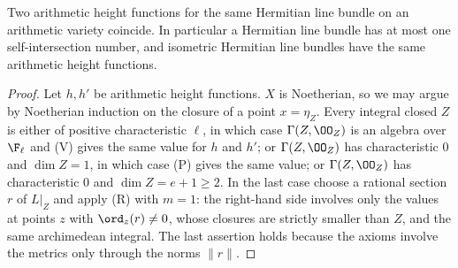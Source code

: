 \begin{lemma}\label{pf:covol:lem:unique}
Two arithmetic height functions for the same Hermitian line bundle on an arithmetic variety coincide.
In particular a Hermitian line bundle has at most one self-intersection number, and isometric Hermitian
line bundles have the same arithmetic height functions.
\end{lemma}

\begin{proof}
Let $h,h'$ be arithmetic height functions. $X$ is Noetherian, so we may argue by Noetherian induction on
the closure of a point $x=\eta_Z$. Every integral closed $Z$ is either of positive characteristic $\ell$,
in which case $\Gamma(Z,\OO_Z)$ is an algebra over $\F_\ell$ and (V) gives the same value for $h$ and $h'$;
or $\Gamma(Z,\OO_Z)$ has characteristic $0$ and $\dim Z=1$, in which case (P) gives the same value;
or $\Gamma(Z,\OO_Z)$ has characteristic $0$ and $\dim Z=e+1\ge2$. In the last case choose a rational
section $r$ of $L|_Z$ and apply (R) with $m=1$: the right-hand side involves only the values at points
$z$ with $\ord_z(r)\ne0$, whose closures are strictly smaller than $Z$, and the same archimedean
integral. The last assertion holds because the axioms involve the metrics only through the norms
$\|r\|$.
\end{proof}

